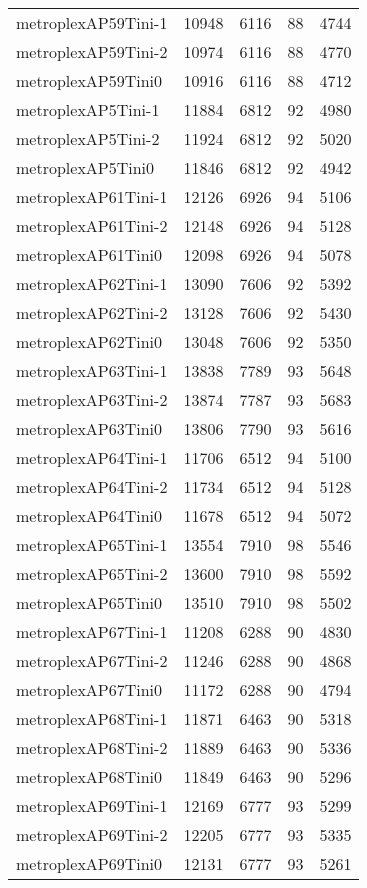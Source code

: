 \begin{longtable}{lrrrr}
metroplexAP59Tini-1 & 10948 & 6116 & 88 & 4744 \\
metroplexAP59Tini-2 & 10974 & 6116 & 88 & 4770 \\
metroplexAP59Tini0 & 10916 & 6116 & 88 & 4712 \\
metroplexAP5Tini-1 & 11884 & 6812 & 92 & 4980 \\
metroplexAP5Tini-2 & 11924 & 6812 & 92 & 5020 \\
metroplexAP5Tini0 & 11846 & 6812 & 92 & 4942 \\
metroplexAP61Tini-1 & 12126 & 6926 & 94 & 5106 \\
metroplexAP61Tini-2 & 12148 & 6926 & 94 & 5128 \\
metroplexAP61Tini0 & 12098 & 6926 & 94 & 5078 \\
metroplexAP62Tini-1 & 13090 & 7606 & 92 & 5392 \\
metroplexAP62Tini-2 & 13128 & 7606 & 92 & 5430 \\
metroplexAP62Tini0 & 13048 & 7606 & 92 & 5350 \\
metroplexAP63Tini-1 & 13838 & 7789 & 93 & 5648 \\
metroplexAP63Tini-2 & 13874 & 7787 & 93 & 5683 \\
metroplexAP63Tini0 & 13806 & 7790 & 93 & 5616 \\
metroplexAP64Tini-1 & 11706 & 6512 & 94 & 5100 \\
metroplexAP64Tini-2 & 11734 & 6512 & 94 & 5128 \\
metroplexAP64Tini0 & 11678 & 6512 & 94 & 5072 \\
metroplexAP65Tini-1 & 13554 & 7910 & 98 & 5546 \\
metroplexAP65Tini-2 & 13600 & 7910 & 98 & 5592 \\
metroplexAP65Tini0 & 13510 & 7910 & 98 & 5502 \\
metroplexAP67Tini-1 & 11208 & 6288 & 90 & 4830 \\
metroplexAP67Tini-2 & 11246 & 6288 & 90 & 4868 \\
metroplexAP67Tini0 & 11172 & 6288 & 90 & 4794 \\
metroplexAP68Tini-1 & 11871 & 6463 & 90 & 5318 \\
metroplexAP68Tini-2 & 11889 & 6463 & 90 & 5336 \\
metroplexAP68Tini0 & 11849 & 6463 & 90 & 5296 \\
metroplexAP69Tini-1 & 12169 & 6777 & 93 & 5299 \\
metroplexAP69Tini-2 & 12205 & 6777 & 93 & 5335 \\
metroplexAP69Tini0 & 12131 & 6777 & 93 & 5261 \\

\end{longtable}
